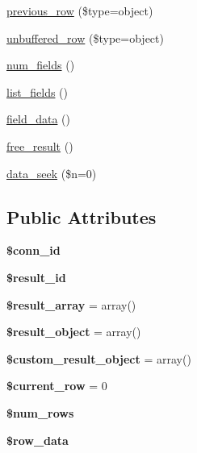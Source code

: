 \begin{DoxyCompactItemize}
\item 
\mbox{\hyperlink{class_c_i___d_b__result_abb6c9f105683b802fbdaf56f11d9ea1a}{previous\+\_\+row}} (\$type=\textquotesingle{}object\textquotesingle{})
\item 
\mbox{\hyperlink{class_c_i___d_b__result_aec3a1aa9a8472f83d3329c94f8271756}{unbuffered\+\_\+row}} (\$type=\textquotesingle{}object\textquotesingle{})
\item 
\mbox{\hyperlink{class_c_i___d_b__result_a1dbf6be1e4f7d502a83459e63366e952}{num\+\_\+fields}} ()
\item 
\mbox{\hyperlink{class_c_i___d_b__result_a4b6a5075f24b2595a92c4e7f37d770a0}{list\+\_\+fields}} ()
\item 
\mbox{\hyperlink{class_c_i___d_b__result_aae5122760c167b25c891512b026e5d95}{field\+\_\+data}} ()
\item 
\mbox{\hyperlink{class_c_i___d_b__result_a70bf721dd584979a3c54c3fe9059627c}{free\+\_\+result}} ()
\item 
\mbox{\hyperlink{class_c_i___d_b__result_a0b69bd8cc07e4311f7145ab465df8da2}{data\+\_\+seek}} (\$n=0)
\end{DoxyCompactItemize}
\subsection*{Public Attributes}
\begin{DoxyCompactItemize}
\item 
\mbox{\label{class_c_i___d_b__result_acc67613173cd8f040cf21bb57c4c20e0}} 
{\bfseries \$conn\+\_\+id}
\item 
\mbox{\label{class_c_i___d_b__result_a2af9640f5051a88e05ba3a5b170dde30}} 
{\bfseries \$result\+\_\+id}
\item 
\mbox{\label{class_c_i___d_b__result_a5083914e60aab36358e5aac0671321f5}} 
{\bfseries \$result\+\_\+array} = array()
\item 
\mbox{\label{class_c_i___d_b__result_a724965ecce1993b0f3f4c0b6c1c3c71b}} 
{\bfseries \$result\+\_\+object} = array()
\item 
\mbox{\label{class_c_i___d_b__result_a470a62be9b7cd8cc4e49d95f47a0f220}} 
{\bfseries \$custom\+\_\+result\+\_\+object} = array()
\item 
\mbox{\label{class_c_i___d_b__result_ac128f6f983f347ec6bdf011b3bd95023}} 
{\bfseries \$current\+\_\+row} = 0
\item 
\mbox{\label{class_c_i___d_b__result_add554300c48f95630d5c5b89952a6836}} 
{\bfseries \$num\+\_\+rows}
\item 
\mbox{\label{class_c_i___d_b__result_aaa9c1ec18bf9c6a18f0909c76fb98c0a}} 
{\bfseries \$row\+\_\+data}
\end{DoxyCompactItemize}
